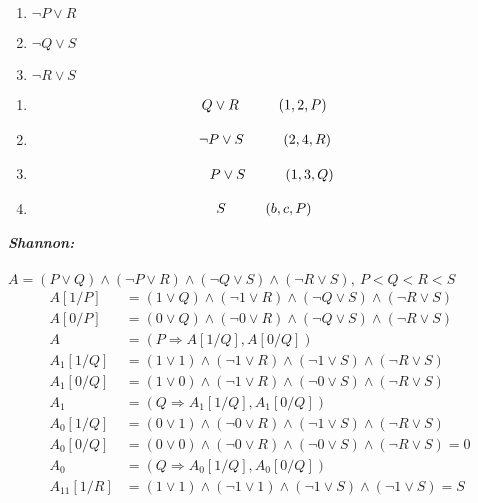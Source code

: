 \documentclass[a4paper,12pt, centered]{article}
\newcommand\tab[1][1cm]{\hspace*{#1}}
\begin{document}
\begin{enumerate}
\begin{multicols}{4}
\begin{enumerate}[(1)]
			\item $\neg P\lor R$
			\item $\neg Q\lor S$
			\item $\neg R\lor S$
		\end{enumerate}
	\end{multicols}
	\begin{multicols}{2}
		\begin{enumerate}
			\item \begin{align*}
				Q\lor R\tab &(1,2,P)
			\end{align*}
			\item \begin{align*}
				\neg P\lor S\tab & (2,4,R) 
			\end{align*}
			\item \begin{align*}
				P\lor S\tab (1,3,Q)
			\end{align*}
			\item \begin{align*}
				S\tab & (b,c,P)
			\end{align*}
		\end{enumerate}
	\end{multicols}
	\emph{\textbf{Shannon:}}\\\\
	$A=(P\lor Q)\land(\neg P\lor R)\land(\neg Q\lor S)\land (\neg R\lor S),\>P<Q<R<S$
	\begin{align*}
		A[1/P]&=(1\lor Q)\land(\neg 1\lor R)\land(\neg Q\lor S)\land (\neg R\lor S)\\
		A[0/P]&=(0\lor Q)\land(\neg 0\lor R)\land(\neg Q\lor S)\land (\neg R\lor S)\\
		A&=(P\Rightarrow A[1/Q],A[0/Q])\\
		A_1[1/Q]&=(1\lor 1)\land(\neg 1\lor R)\land(\neg 1\lor S)\land (\neg R\lor S)\\
		A_1[0/Q]&=(1\lor 0)\land(\neg 1\lor R)\land(\neg 0\lor S)\land (\neg R\lor S)\\
		A_1&=(Q\Rightarrow A_1[1/Q],A_1[0/Q])\\
		A_0[1/Q]&=(0\lor 1)\land(\neg 0\lor R)\land(\neg 1\lor S)\land (\neg R\lor S)\\
		A_0[0/Q]&=(0\lor 0)\land(\neg 0\lor R)\land(\neg 0\lor S)\land (\neg R\lor S)=0\\
		A_0&=(Q\Rightarrow A_0[1/Q],A_0[0/Q])\\
		A_{11}[1/R]&=(1\lor 1)\land(\neg 1\lor 1)\land(\neg 1\lor S)\land (\neg 1\lor S)=S\\

\end{align*}
\end{enumerate}
\end{document}
